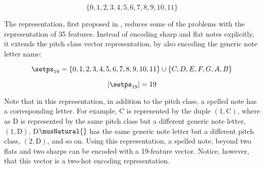 \begin{equation}
    \{0, 1, 2, 3, 4, 5, 6, 7, 8, 9, 10, 11\}
\end{equation}

The representation, first proposed in
\textcite{napoleslopez2021augmentednet}, reduces some of the
problems with the representation of 35 features. Instead of
encoding \gls{sharp} and \gls{flat} notes explicitly, it
extends the pitch class vector representation, by also
encoding the generic note letter name:

\begin{equation}
    \label{eq:pitch_spelling_19}
    \setps_{19} = \{0, 1, 2, 3, 4, 5, 6, 7, 8, 9, 10, 11\} 
    \cup \{C, D, E, F, G, A, B\}
\end{equation}


\begin{equation}
    \label{eq:pitch_spelling_19_magnitude}
    | \setps_{19} | = 19
\end{equation}

Note that in this representation, in addition to the pitch
class, a spelled note has a corresponding letter. For
example, C\musSharp{} is represented by the duple $(1,
\text{C})$, where as D\musFlat{} is represented by the same
pitch class but a different generic note letter, $(1,
\text{D})$. D$\musNatural{}$ has the same generic note
letter but a different pitch class, $(2, \text{D})$, and so
on. Using this representation, a spelled note, beyond two
flats and two sharps can be encoded with a 19-feature
vector. Notice, however, that this vector is a two-hot
encoding representation.
